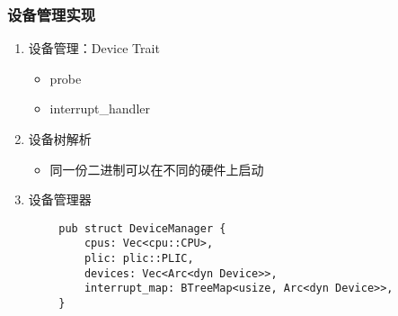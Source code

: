 \begin{frame}[fragile]
    \frametitle{设备管理实现}

    \begin{enumerate}
        \item 设备管理：Device Trait
              \begin{itemize}
                  \item probe
                  \item interrupt\_handler
              \end{itemize}
        \item 设备树解析
              \begin{itemize}
                  \item 同一份二进制可以在不同的硬件上启动
              \end{itemize}
        \item 设备管理器
    \end{enumerate}

    \begin{lstlisting}
        pub struct DeviceManager {
            cpus: Vec<cpu::CPU>,
            plic: plic::PLIC,
            devices: Vec<Arc<dyn Device>>,
            interrupt_map: BTreeMap<usize, Arc<dyn Device>>,
        }
    \end{lstlisting}


\end{frame}

